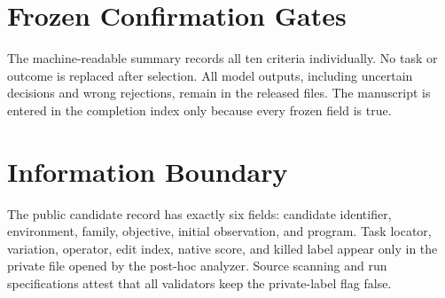 \documentclass[pdflatex,sn-basic]{sn-jnl}
\begin{document}
\begin{appendices}
\section{Frozen Confirmation Gates}
The machine-readable summary records all ten criteria individually. No task or outcome is replaced after selection. All model outputs, including uncertain decisions and wrong rejections, remain in the released files. The manuscript is entered in the completion index only because every frozen field is true.

\section{Information Boundary}
The public candidate record has exactly six fields: candidate identifier, environment, family, objective, initial observation, and program. Task locator, variation, operator, edit index, native score, and killed label appear only in the private file opened by the post-hoc analyzer. Source scanning and run specifications attest that all validators keep the private-label flag false.
\end{appendices}


\end{document}
